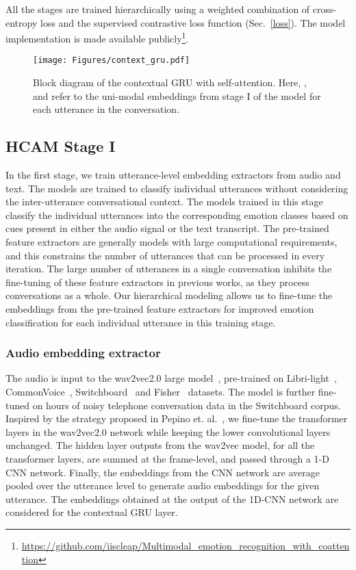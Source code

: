 \documentclass[lettersize,journal]{IEEEtran}
\begin{document}
All the stages are trained hierarchically using a weighted combination of cross-entropy loss and the supervised contrastive loss function (Sec.~\ref{loss}). 
The model implementation is made available publicly\footnote{\url{https://github.com/iiscleap/Multimodal_emotion_recognition_with_coattention}}. 
\begin{figure}[t!]
    \centering
    \texttt{[image: Figures/context\_gru.pdf]}
    \caption{Block diagram of the contextual GRU with self-attention. Here, ,  and  refer to the uni-modal embeddings from stage I of the model for each utterance in the conversation.}
    \label{fig:context gru}
\end{figure}
\subsection{HCAM Stage I}\label{stage1}
In the first stage, we train utterance-level embedding extractors from audio and text. The models are trained to classify individual utterances without considering the inter-utterance conversational context. The models trained in this stage classify the individual utterances into the corresponding emotion classes based on cues present in either the audio signal or the text transcript. The pre-trained feature extractors are generally models with large computational requirements, and this constrains the number of utterances that can be processed in every iteration. The large number of utterances in a single conversation inhibits the fine-tuning of these feature extractors in previous works, as they process conversations as a whole. Our hierarchical modeling allows us to fine-tune the embeddings from the pre-trained feature extractors for improved emotion classification for each individual utterance in this training stage.


\subsubsection{Audio embedding extractor}\label{audfeat}
The audio is input to the wav2vec2.0 large model~\cite{baevski2020wav2vec}, pre-trained on Libri-light~\cite{kahn2020libri}, CommonVoice~\cite{ardila2020common}, Switchboard~\cite{godfrey1992switchboard} and Fisher~\cite{cieri2004fisher} datasets. The model is further fine-tuned on  hours of noisy telephone conversation data in the Switchboard corpus. 
Inspired by the strategy proposed in Pepino et. al.~\cite{pepino2021emotion}, we fine-tune the transformer layers in the wav2vec2.0 network while keeping the lower convolutional layers unchanged. The hidden layer outputs from the wav2vec model, for all the transformer layers, are summed at the frame-level, and passed through a 1-D CNN network. 
  Finally, the embeddings from the CNN network are average pooled over the utterance level to generate audio embeddings for the given utterance.
 The embeddings obtained at the output of the 1D-CNN network are considered for the contextual GRU layer.
\end{document}
